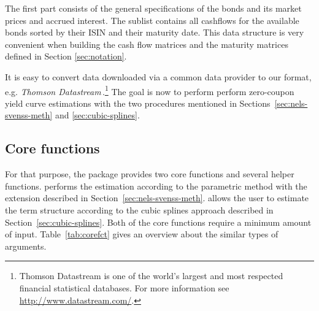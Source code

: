 The first part consists of the general specifications of the bonds and its market prices and accrued interest. The sublist  contains all cashflows for the available bonds sorted by their ISIN and their maturity date. This data structure is very convenient when building the cash flow matrices and the maturity matrices defined in Section \ref{sec:notation}.

It is easy to convert data downloaded via a common data provider to our format, e.g. \emph{Thomson Datastream}\texttrademark\,.\footnote{Thomson Datastream is one of the world's largest and most respected financial statistical databases. For more information see \url{http://www.datastream.com/}.} The goal is now to perform perform zero-coupon yield curve estimations with the two procedures mentioned in Sections~\ref{sec:nels-svenss-meth} and \ref{sec:cubic-splines}.

\subsection{Core functions}
\label{sec:main-functions}

For that purpose, the package  provides two core functions and several helper functions.  performs the estimation according to the parametric \cite{Nelson1987} method with the \cite{Svensson1994} extension described in Section~\ref{sec:nels-svenss-meth}.   allows the user to estimate the term structure according to the \cite{McCulloch1975} cubic splines approach described in Section~\ref{sec:cubic-splines}. Both of the core functions require a minimum amount of input. Table~\ref{tab:corefct} gives an overview about the similar types of arguments.


